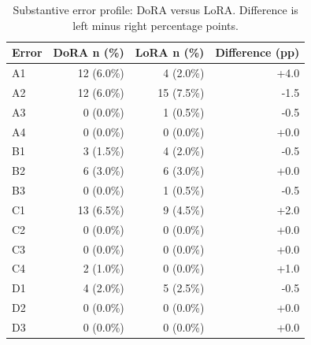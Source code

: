\begin{table}[htbp]
\centering
\small
\begin{tabular}{lrrr}
\toprule
Error & DoRA n (\%) & LoRA n (\%) & Difference (pp) \\
\midrule
A1 & 12 (6.0\%) & 4 (2.0\%) & +4.0 \\
A2 & 12 (6.0\%) & 15 (7.5\%) & -1.5 \\
A3 & 0 (0.0\%) & 1 (0.5\%) & -0.5 \\
A4 & 0 (0.0\%) & 0 (0.0\%) & +0.0 \\
B1 & 3 (1.5\%) & 4 (2.0\%) & -0.5 \\
B2 & 6 (3.0\%) & 6 (3.0\%) & +0.0 \\
B3 & 0 (0.0\%) & 1 (0.5\%) & -0.5 \\
C1 & 13 (6.5\%) & 9 (4.5\%) & +2.0 \\
C2 & 0 (0.0\%) & 0 (0.0\%) & +0.0 \\
C3 & 0 (0.0\%) & 0 (0.0\%) & +0.0 \\
C4 & 2 (1.0\%) & 0 (0.0\%) & +1.0 \\
D1 & 4 (2.0\%) & 5 (2.5\%) & -0.5 \\
D2 & 0 (0.0\%) & 0 (0.0\%) & +0.0 \\
D3 & 0 (0.0\%) & 0 (0.0\%) & +0.0 \\
\bottomrule
\end{tabular}
\caption{Substantive error profile: DoRA versus LoRA. Difference is left minus right percentage points.}
\label{tab:dora_lora_dora_vs_lora}
\end{table}
